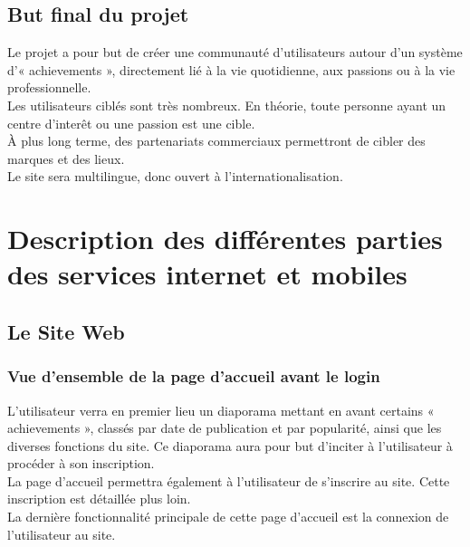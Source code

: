 \documentclass{life-fr}
\begin{document}
\section{But final du projet}

Le projet a pour but de créer une communauté d'utilisateurs autour d'un système d'« achievements », directement lié à la vie quotidienne, aux passions ou à la vie professionnelle.\\

Les utilisateurs ciblés sont très nombreux. En théorie, toute personne ayant un centre d'interêt ou une passion est une cible.\\

À plus long terme, des partenariats commerciaux permettront de cibler des marques et des lieux.\\

Le site sera multilingue, donc ouvert à l'internationalisation.


\chapter{Description des différentes parties des services internet et mobiles}

\section{Le Site Web}

\subsection{Vue d'ensemble de la page d'accueil avant le login}

L'utilisateur verra en premier lieu un diaporama mettant en avant certains « achievements », classés par date de publication et par popularité, ainsi que les diverses fonctions du site. Ce diaporama aura pour but d'inciter à l'utilisateur à procéder à son inscription.\\

La page d'accueil permettra également à l'utilisateur de s'inscrire au site. Cette inscription est détaillée plus loin.\\

La dernière fonctionnalité principale de cette page d'accueil est la connexion de l'utilisateur au site.\\
\end{document}
